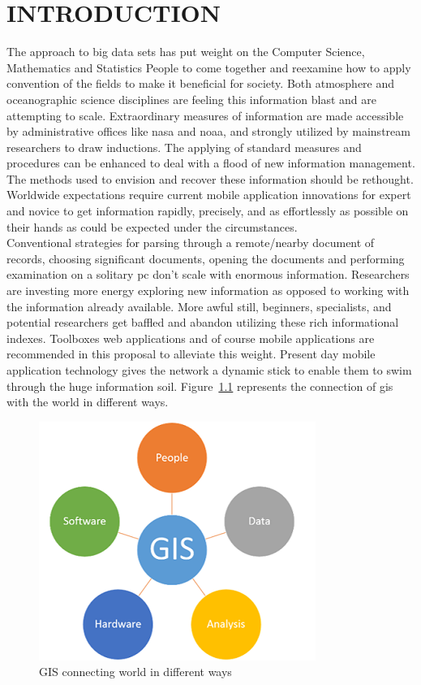 \chapter{INTRODUCTION}
\label{chap:intro}


The approach to big data sets has put weight on the Computer Science, Mathematics and Statistics People to come together and reexamine how to apply convention of the fields to make it beneficial for society. Both atmosphere and oceanographic science disciplines are feeling this information blast and are attempting to scale. Extraordinary measures of information are made accessible by administrative offices like \gls{nasa} and \gls{noaa}, and strongly utilized by mainstream researchers to draw inductions. The applying of standard measures and procedures can be enhanced to deal with a flood of new information management. The methods used to envision and recover these information should be rethought. Worldwide expectations require current mobile application innovations for expert and novice to get information rapidly, precisely, and as effortlessly as possible on their hands as could be expected under the circumstances. \\
Conventional strategies for parsing through a remote/nearby document of records, choosing significant documents, opening the documents and performing examination on a solitary \gls{pc} don't scale with enormous information. Researchers are investing more energy exploring new information as opposed to working with the information already available. More awful still, beginners, specialists, and potential researchers get baffled and abandon utilizing these rich informational indexes. Toolboxes web applications and of course mobile applications are recommended in this proposal to alleviate this weight. Present day mobile application technology gives the network a dynamic stick to enable them to swim through the huge information soil. Figure~\ref{fig:gis_world} represents the connection of \gls{gis} with the world in different ways.

    \begin{figure}[H]
            \centering
            \includegraphics[width=0.50\linewidth]{figures/ch1/gis.png}
            \caption{\label{fig:gis_world} GIS connecting world in different ways \cite{CDC}}
    \end{figure}

